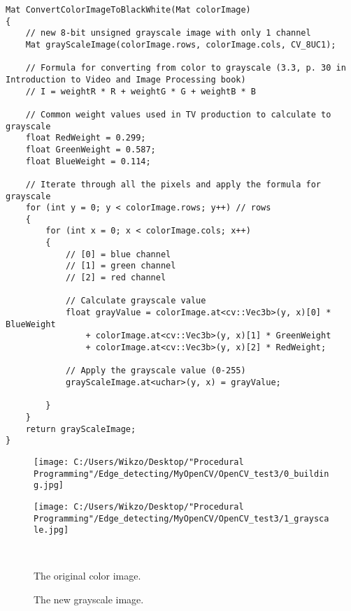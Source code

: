 \begin{lstlisting}
Mat ConvertColorImageToBlackWhite(Mat colorImage)
{
	// new 8-bit unsigned grayscale image with only 1 channel
	Mat grayScaleImage(colorImage.rows, colorImage.cols, CV_8UC1); 

	// Formula for converting from color to grayscale (3.3, p. 30 in Introduction to Video and Image Processing book)
	// I = weightR * R + weightG * G + weightB * B

	// Common weight values used in TV production to calculate to grayscale
	float RedWeight = 0.299;
	float GreenWeight = 0.587;
	float BlueWeight = 0.114;

	// Iterate through all the pixels and apply the formula for grayscale
	for (int y = 0; y < colorImage.rows; y++) // rows
	{
		for (int x = 0; x < colorImage.cols; x++)
		{
			// [0] = blue channel
			// [1] = green channel
			// [2] = red channel

			// Calculate grayscale value
			float grayValue = colorImage.at<cv::Vec3b>(y, x)[0] * BlueWeight
				+ colorImage.at<cv::Vec3b>(y, x)[1] * GreenWeight
				+ colorImage.at<cv::Vec3b>(y, x)[2] * RedWeight;

			// Apply the grayscale value (0-255)
			grayScaleImage.at<uchar>(y, x) = grayValue;		

		}
	}	
	return grayScaleImage;
}
\end{lstlisting}

\begin{figure}[htbp]\centering
	\begin{minipage}[b]{0.48\textwidth}\centering
		\texttt{[image: C:/Users/Wikzo/Desktop/"Procedural Programming"/Edge\_detecting/MyOpenCV/OpenCV\_test3/0\_building.jpg]} %
	\end{minipage}\hfill
	\begin{minipage}[b]{0.48\textwidth}\centering
		\texttt{[image: C:/Users/Wikzo/Desktop/"Procedural Programming"/Edge\_detecting/MyOpenCV/OpenCV\_test3/1\_grayscale.jpg]} %
	\end{minipage}\\ %
	\begin{minipage}[t]{0.48\textwidth}
		\caption{The original color image.} %
		\label{original_image}
	\end{minipage}\hfill
	\begin{minipage}[t]{0.48\textwidth}
		\caption{The new grayscale image.} %
		\label{new_grayscale_image}
	\end{minipage}
\end{figure}

